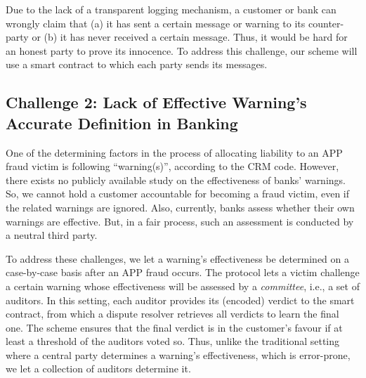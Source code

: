  Due to the lack of a transparent logging mechanism, a customer or bank can wrongly claim that (a) it has sent a certain message or warning to its counter-party or (b) it has never received a certain message.  Thus, it would be hard for an honest party to prove its innocence. To address this challenge, our scheme will use a  smart contract to which each party sends its messages.





\vspace{-3mm}
\subsection{Challenge 2: Lack of Effective Warning's Accurate Definition in Banking}\label{sec::Lack-of-Effective-Warning-Definition}
\vspace{-1mm}

One of the determining factors in the process of allocating liability to an APP fraud victim is following ``warning(s)'', according to the CRM code. However, there exists no publicly available study on the effectiveness of banks' warnings. So, we cannot hold a customer accountable for becoming a fraud victim,  even if the related warnings are ignored. Also, currently,  banks assess whether their own warnings are effective. But, in a fair process, such an assessment is conducted by a neutral third party.  

To address these challenges, we let a warning's effectiveness be determined on a case-by-case basis after an APP fraud occurs. The protocol lets a victim challenge a certain warning whose effectiveness will be assessed by a \emph{committee}, i.e., a  set of auditors. In this setting, each auditor provides its (encoded) verdict to the smart contract, from which a dispute resolver retrieves all verdicts to learn the final one. The scheme ensures that the final verdict is in the customer's favour if at least a threshold of the auditors voted so. Thus, unlike the traditional setting where a central party determines a warning's effectiveness, which is error-prone, we let a collection of auditors determine it.



\vspace{-3.1mm}


